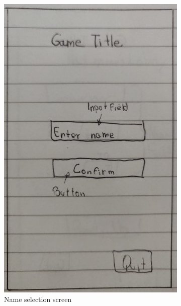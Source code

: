 \documentclass{dissertation}
\begin{document}
\begin{figure}[H]
\begin{subfigure}[h]{.5\textwidth}
\centering
\includegraphics[width = .8\linewidth]{images/paper-prototype1.jpeg}
\caption{Name selection screen}
\label{fig:pp1}
\end{subfigure}
\begin{subfigure}[h]{.5\textwidth}
\centering

\end{subfigure}
\end{figure}
\end{document}
